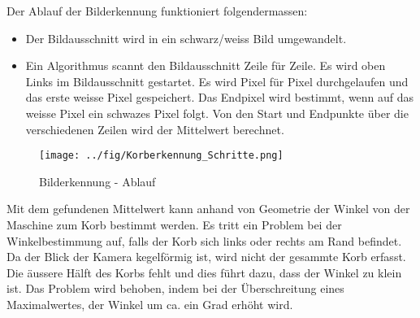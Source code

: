 Der Ablauf der Bilderkennung funktioniert folgendermassen:
\begin{itemize}
	\item Der Bildausschnitt wird in ein schwarz/weiss Bild umgewandelt.
	\item Ein Algorithmus scannt den Bildausschnitt Zeile für Zeile.
	\subitem Es wird oben Links im Bildausschnitt gestartet.
	\subitem Es wird Pixel für Pixel durchgelaufen und das erste weisse Pixel gespeichert.
	\subitem Das Endpixel wird bestimmt, wenn auf das weisse Pixel ein schwazes Pixel folgt.
	\subitem Von den Start und Endpunkte über die verschiedenen Zeilen wird der Mittelwert berechnet.
\end{itemize}

\begin{figure}[h!]          
	\centering             
	\texttt{[image: ../fig/Korberkennung\_Schritte.png]}
	\caption{Bilderkennung - Ablauf}
	\label{fig:Bilderkennung_ablauf}        
\end{figure}

Mit dem gefundenen Mittelwert kann anhand von Geometrie der Winkel von der Maschine zum Korb bestimmt werden.
Es tritt ein Problem bei der Winkelbestimmung auf, falls der Korb sich links oder rechts am Rand befindet.
Da der Blick der Kamera kegelförmig ist, wird nicht der gesammte Korb erfasst. Die äussere Hälft des Korbs fehlt
und dies führt dazu, dass der Winkel zu klein ist. Das Problem wird behoben, indem bei der Überschreitung eines
Maximalwertes, der Winkel um ca. ein Grad erhöht wird.

